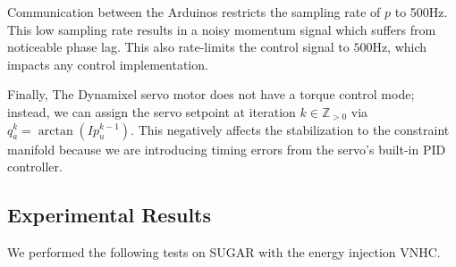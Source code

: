 \documentclass[journal,twoside,web, twocolumn,draftcls]{ieeecolor}
\begin{document}
Communication between the Arduinos restricts the sampling rate of \(p\) to
500Hz.
This low sampling rate results in a noisy momentum signal which suffers
from noticeable phase lag.
This also rate-limits the control signal to \(500\)Hz, which impacts any control
implementation.

Finally, The Dynamixel servo motor does not have a torque control mode; instead,
we can assign the servo setpoint at iteration \(k \in \mathbb{Z}_{> 0}\)
via \(q_a^{k} = \arctan(I p_u^{k-1})\).
This negatively affects the stabilization to the constraint
manifold because we are introducing timing errors from the servo's built-in PID
controller.

\subsection{Experimental Results}

We performed the following tests on SUGAR with the energy injection VNHC.
\end{document}
